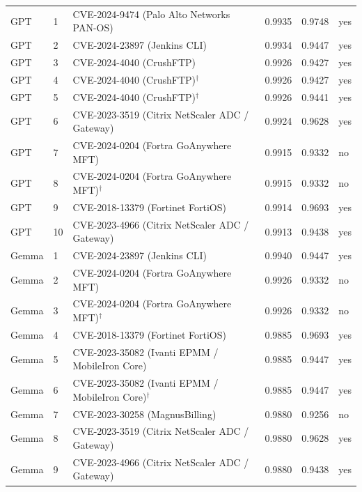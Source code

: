 \documentclass[11pt]{article}
\begin{document}
\begin{longtable}{llp{}rrl}
GPT      &  1 & CVE-2024-9474 (Palo Alto Networks PAN-OS)               & 0.9935 & 0.9748 & yes \\
GPT      &  2 & CVE-2024-23897 (Jenkins CLI)                            & 0.9934 & 0.9447 & yes \\
GPT      &  3 & CVE-2024-4040 (CrushFTP)                                & 0.9926 & 0.9427 & yes \\
GPT      &  4 & CVE-2024-4040 (CrushFTP)$^{\dagger}$                    & 0.9926 & 0.9427 & yes \\
GPT      &  5 & CVE-2024-4040 (CrushFTP)$^{\dagger}$                    & 0.9926 & 0.9441 & yes \\
GPT      &  6 & CVE-2023-3519 (Citrix NetScaler ADC / Gateway)          & 0.9924 & 0.9628 & yes \\
GPT      &  7 & CVE-2024-0204 (Fortra GoAnywhere MFT)                   & 0.9915 & 0.9332 & no  \\
GPT      &  8 & CVE-2024-0204 (Fortra GoAnywhere MFT)$^{\dagger}$       & 0.9915 & 0.9332 & no  \\
GPT      &  9 & CVE-2018-13379 (Fortinet FortiOS)                       & 0.9914 & 0.9693 & yes \\
GPT      & 10 & CVE-2023-4966 (Citrix NetScaler ADC / Gateway)          & 0.9913 & 0.9438 & yes \\
\midrule
Gemma    &  1 & CVE-2024-23897 (Jenkins CLI)                            & 0.9940 & 0.9447 & yes \\
Gemma    &  2 & CVE-2024-0204 (Fortra GoAnywhere MFT)                   & 0.9926 & 0.9332 & no  \\
Gemma    &  3 & CVE-2024-0204 (Fortra GoAnywhere MFT)$^{\dagger}$       & 0.9926 & 0.9332 & no  \\
Gemma    &  4 & CVE-2018-13379 (Fortinet FortiOS)                       & 0.9885 & 0.9693 & yes \\
Gemma    &  5 & CVE-2023-35082 (Ivanti EPMM / MobileIron Core)          & 0.9885 & 0.9447 & yes \\
Gemma    &  6 & CVE-2023-35082 (Ivanti EPMM / MobileIron Core)$^{\dagger}$ & 0.9885 & 0.9447 & yes \\
Gemma    &  7 & CVE-2023-30258 (MagnusBilling)                          & 0.9880 & 0.9256 & no  \\
Gemma    &  8 & CVE-2023-3519 (Citrix NetScaler ADC / Gateway)          & 0.9880 & 0.9628 & yes \\
Gemma    &  9 & CVE-2023-4966 (Citrix NetScaler ADC / Gateway)          & 0.9880 & 0.9438 & yes \\

\end{longtable}
\end{document}
